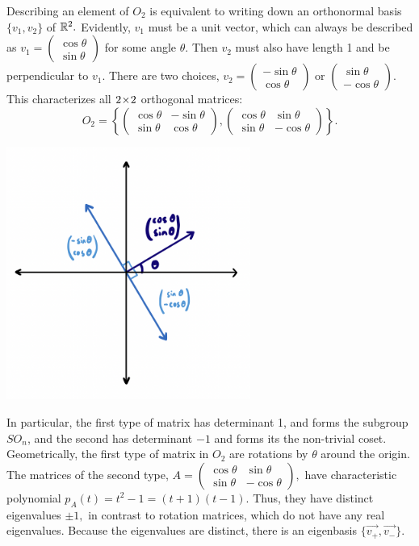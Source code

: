 \begin{example}[$O_2$]
Describing an element of $O_2$ is equivalent to writing down an orthonormal basis $\{v_1, v_2\}$ of $\mathbb R^2.$ Evidently, $v_1$ must be a unit vector, which can always be described as $v_1 = \begin{pmatrix} \cos\theta \\ \sin\theta \end{pmatrix}$ for some angle $\theta.$ Then $v_2$ must also have length 1 and be perpendicular to $v_1.$ There are two choices, $
v_2 = \begin{pmatrix}
-\sin\theta \\
\cos\theta
\end{pmatrix} \text{ or } \begin{pmatrix}
\sin\theta \\
-\cos\theta
\end{pmatrix}.$ This characterizes all $2\hspace{0.05em}{\times}\hspace{0.05em} 2$ orthogonal matrices:
\[
O_2 = \left\{ 
\begin{pmatrix}
\cos \theta  & - \sin \theta \\
\sin \theta & \cos \theta \end{pmatrix}
,\begin{pmatrix}
\cos \theta & \sin \theta \\
\sin \theta & -\cos \theta
\end{pmatrix} 
\right\}.
\]
\begin{center}
    \includegraphics[width=8cm]{Lecture Files and Images/lec12-1.png}
\end{center}
\end{example}


In particular, the first type of matrix has determinant 1, and forms the subgroup $SO_n$, and the second has determinant $-1$ and forms its the non-trivial coset. Geometrically, the first type of matrix in $O_2$ are rotations by $\theta$ around the origin. The matrices of the second type, $A = \begin{pmatrix}
\cos \theta & \sin \theta \\
\sin \theta & -\cos \theta
\end{pmatrix},$ have characteristic polynomial $p_A(t) = t^2 - 1 = (t + 1)(t - 1)$. Thus, they have distinct eigenvalues $\pm 1,$ in contrast to rotation matrices, which do not have any real eigenvalues. Because the eigenvalues are distinct, there is an eigenbasis $\{\vec{v_+}, \vec{v_-}\}$.


